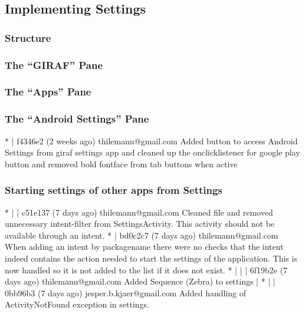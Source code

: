 \subsection{Implementing Settings}

\subsubsection{Structure}

\subsubsection{The ``GIRAF'' Pane}


\subsubsection{The ``Apps'' Pane}


 \subsubsection{The ``Android Settings'' Pane}
 * | f4346e2 (2 weeks ago) thilemann@gmail.com Added button to access Android Settings from giraf settings app and cleaned up the onclicklistener for google play button and removed bold fontface from tab buttons when active\\
 
 \subsubsection{Starting settings of other apps from Settings}
 * | | c51e137 (7 days ago) thilemann@gmail.com Cleaned file and removed unnecessary intent-filter from SettingsActivity. This activity should not be available through an intent.
 * | bd0c2c7 (7 days ago) thilemann@gmail.com When adding an intent by packagename there were no checks that the intent indeed contains the action needed to start the settings of the application. This is now
 handled so it is not added to the list if it does not exist.
 * | | | 6f19b2e (7 days ago) thilemann@gmail.com Added Sequence (Zebra) to settings
 | * | | 0bb96b3 (7 days ago) jesper.b.kjaer@gmail.com Added handling of ActivityNotFound exception in settings.